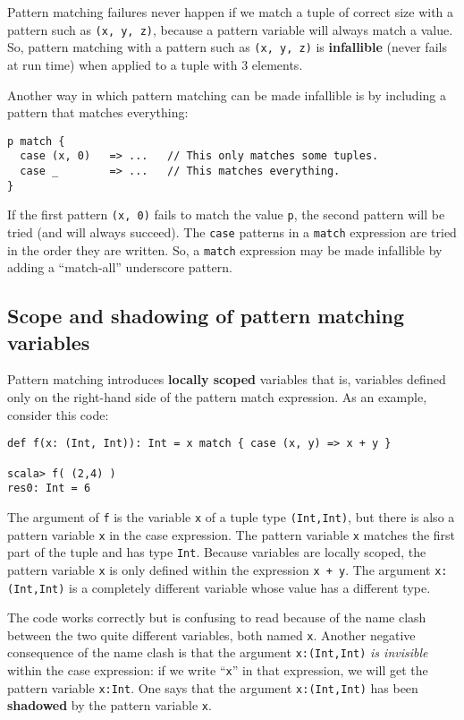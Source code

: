 Pattern matching failures never happen if we match a tuple of correct
size with a pattern such as \lstinline!(x, y, z)!, because a pattern
variable will always match a value. So, pattern matching with a pattern
such as \lstinline!(x, y, z)! is \textbf{infallible}
(never fails at run time) when applied to a tuple with $3$ elements.

Another way in which pattern matching can be made infallible is by
including a pattern that matches everything:
\begin{lstlisting}
p match {
  case (x, 0)   => ...   // This only matches some tuples.
  case _        => ...   // This matches everything.
}
\end{lstlisting}
If the first pattern \lstinline!(x, 0)! fails to match the value
\lstinline!p!, the second pattern will be tried (and will always
succeed). The \lstinline!case! patterns in a \lstinline!match! expression
are tried in the order they are written. So, a \lstinline!match!
expression may be made infallible by adding a ``match-all'' underscore
pattern.

\subsection{Scope and shadowing of pattern matching variables\label{subsec:Scope-and-shadowing-variables}}

Pattern matching introduces \textbf{locally scoped}
variables \textendash{} that is, variables defined only on the right-hand
side of the pattern match expression. As an example, consider this
code:
\begin{lstlisting}
def f(x: (Int, Int)): Int = x match { case (x, y) => x + y }

scala> f( (2,4) )
res0: Int = 6
\end{lstlisting}
The argument of \lstinline!f! is the variable \lstinline!x! of a
tuple type \lstinline!(Int,Int)!, but there is also a pattern variable
\lstinline!x! in the case expression. The pattern variable \lstinline!x!
matches the first part of the tuple and has type \lstinline!Int!.
Because variables are locally scoped, the pattern variable \lstinline!x!
is only defined within the expression \lstinline!x + y!. The argument
\lstinline!x:(Int,Int)! is a completely different variable whose
value has a different type.

The code works correctly but is confusing to read because of the name
clash between the two quite different variables, both named \lstinline!x!.
Another negative consequence of the name clash is that the argument
\lstinline!x:(Int,Int)! \emph{is invisible} within the case expression:
if we write ``\lstinline!x!'' in that expression, we will get the
pattern variable \lstinline!x:Int!. One says that the argument \lstinline!x:(Int,Int)!
has been \textbf{shadowed} by the pattern variable
\lstinline!x!.

